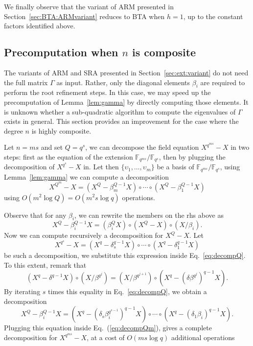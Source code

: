 \documentclass{sig-alternate}
\newcommand{\ff}[1]{\mathbb{F}_{#1}}
\newcommand{\qq}{q}
\newcommand{\QQ}{Q}
\newcommand{\nn}{n}
\newcounter{algo}
\begin{document}
We finally observe that the variant of ARM presented in Section~\ref{sec:BTA:ARMvariant} reduces to BTA when $h=1$, up to the constant factors identified above.



\subsection{Precomputation when $n$ is composite}

The variants of ARM and SRA presented in Section~\ref{sec:ext:variant}
do not need the full matrix $\Gamma$ as input. Rather, only the
diagonal elements $\beta_i$ are required to perform the root
refinement steps. In this case, we may speed up the precomputation of
Lemma~\ref{lem:gamma} by directly computing those elements. It is
unknown whether a sub-quadratic algorithm to compute the eigenvalues
of $\Gamma$ exists in general. This section provides an improvement
for the case where the degree $\nn$ is highly composite.

Let $\nn=ms$ and set $\QQ=\qq^s$, we can decompose the field equation
$X^{\qq^{ms}}-X$ in two steps: first as the equation of the extension
$\ff{\qq^{ms}}/\ff{\qq^s}$, then by plugging the decomposition of
$X^{\qq^s}-X$ in. Let then $\{\upsilon_1,\dots,\upsilon_m\}$ be a
basis of $\ff{\qq^{ms}}/\ff{\qq^s}$, using Lemma~\ref{lem:gamma} we
can compute a decomposition
\begin{equation}
  \label{eq:decompQm}
  X^{\QQ^m}-X = (X^\QQ - \beta_m^{\QQ-1}X)\circ\cdots\circ(X^\QQ - \beta_1^{\QQ-1}X)
\end{equation}
using $O(m^2\log\QQ) = O(m^2s\log\qq)$ operations.

Observe that for any $\beta_i$, we can rewrite the members on the rhs
above as
\begin{equation}
  \label{eq:decompQ}
  X^\QQ - \beta_i^{\QQ-1}X = (\beta_i^\QQ X)\circ(X^\QQ - X)\circ(X/\beta_i).
\end{equation}
Now we can compute recursively a decomposition for $X^Q-X$. Let 
\begin{equation}
  X^{\qq^s}-X = (X^\qq-\delta_s^{\qq-1}X)\circ\cdots\circ(X^\qq-\delta_1^{\qq-1}X)
\end{equation}
be such a decomposition, we substitute this expression inside
Eq.~\eqref{eq:decompQ}. To this extent, remark that
\begin{equation*}
  (X^\qq - \delta^{\qq-1} X)\circ(X/\beta^{\qq^j}) = 
  (X/\beta^{\qq^{j+1}})\circ(X^\qq-(\delta\beta^{\qq^{j}})^{\qq-1}X).
\end{equation*}
By iterating $s$ times this equality in Eq.~\eqref{eq:decompQ}, we
obtain a decomposition
\begin{equation*}
  X^\QQ - \beta_i^{\QQ-1}X = 
  (X^\qq - (\delta_s\beta_i^{\qq^{s-1}})^{\qq-1}X)\circ\cdots\circ(X^\qq - (\delta_1\beta_i)^{\qq-1}X).
\end{equation*}
Plugging this equation inside Eq.~(\ref{eq:decompQm}), gives a
complete decomposition for $X^{\qq^{ms}}-X$, at a cost of
$O(ms\log\qq)$ additional operations
\end{document}
